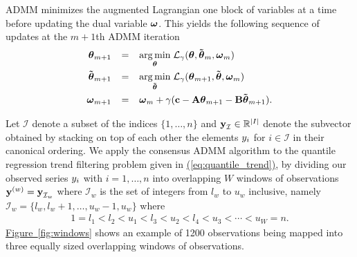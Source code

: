 \documentclass[aoas]{imsart}
\newcommand{\Eqn}[1]{\hyperref[eq:#1]{{\rm (\ref*{eq:#1})}}} %
\newcommand{\Fig}[1]{\hyperref[fig:#1]{Figure~\ref*{fig:#1}}} %
\newcommand{\Eqn}[1]{{(\ref{eq:#1})}} %
\newcommand{\Fig}[1]{{Figure~\ref{fig:#1}}} %
\newcommand{\Real}{\mathbb{R}}
\newcommand{\amp}{\mathop{\:\:\,}\nolimits}
\newcommand{\V}[1]{{\bm{\mathbf{\MakeLowercase{#1}}}}} %
\newcommand{\VE}[2]{\MakeLowercase{#1}_{#2}} %
\newcommand{\Vtilde}[1]{{\bm{\tilde \mathbf{\MakeLowercase{#1}}}}} %
\newcommand{\Vn}[2]{\V{#1}^{(#2)}} %
\newcommand{\M}[1]{{\bm{\mathbf{\MakeUppercase{#1}}}}} %
\begin{document}
ADMM minimizes the augmented Lagrangian one block of variables at a time before updating the dual variable $\V{\omega}$. This yields the following sequence of updates at the $m+1$th ADMM iteration
\begin{equation}
\label{eq:admm_updates}
\begin{split}
\V{\theta}_{m+1} & \amp = \amp \underset{\V{\theta}}{\arg\min}\; \mathcal{L}_\gamma(\V{\theta},\Vtilde{\theta}_{m}, \V{\omega}_{m}) \\
\Vtilde{\theta}_{m+1} & \amp = \amp \underset{\Vtilde{\theta}}{\arg\min}\; \mathcal{L}_\gamma(\V{\theta}_{m+1},\Vtilde{\theta}, \V{\omega}_{m}) \\
\V{\omega}_{m+1} & \amp = \amp \V{\omega}_{m} + \gamma(\V{c} - \M{A}\V{\theta}_{m+1} - \M{B}\Vtilde{\theta}_{m+1}).
\end{split}
\end{equation}



Let $\mathcal{I}$ denote a subset of the indices $\{1, \ldots, n\}$ and $\V{y}_\mathcal{I} \in \Real^{\lvert I \rvert}$ denote the subvector obtained by stacking on top of each other the elements $\VE{y}{i}$ for $i \in \mathcal{I}$ in their canonical ordering.
We apply the consensus ADMM algorithm to the quantile regression trend filtering problem given in \Eqn{quantile_trend}, by dividing our observed series $\VE{y}{i}$ with $i = 1, \ldots, n$ into overlapping $W$ windows of observations $\Vn{y}{w} = \V{y}_{\mathcal{I}_w}$ where $\mathcal{I}_w$ is the set of integers from $l_w$ to $u_w$ inclusive, namely $\mathcal{I}_w = \{l_w, l_w + 1, \ldots, u_w -1, u_w\}$ where
\begin{eqnarray*}
	1 = l_{1} < l_{2} < u_{1} < l_{3} < u_{2} < l_{4} < u_{3} < \cdots < u_{W} = n.
\end{eqnarray*}
\Fig{windows} shows an example of 1200 observations being mapped into three equally sized overlapping windows of observations.
\end{document}
